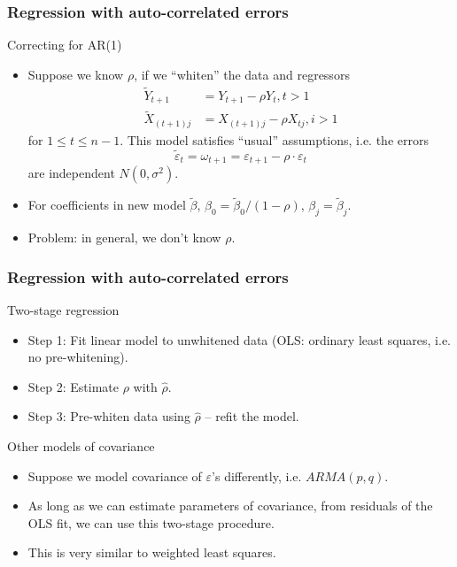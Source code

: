 \documentclass[handout]{beamer}
\begin{document}
   \begin{frame} \frametitle{Regression with auto-correlated errors}

   \begin{block}
   {Correcting for AR(1)                      }
   \begin{itemize}
   \item Suppose we know $\rho$, if we ``whiten'' the data and regressors
   $$
   \begin{aligned}
   \tilde{Y}_{t+1} &= Y_{t+1} - \rho Y_t, t > 1   \\
   \tilde{X}_{(t+1)j} &= X_{(t+1)j} - \rho X_{tj}, i > 1
   \end{aligned}
   $$
   for $1 \leq t \leq n-1$.
   This model satisfies ``usual'' assumptions, i.e. the errors
   $$
   \tilde{\varepsilon}_t = \omega_{t+1} = \varepsilon_{t+1} - \rho \cdot \varepsilon_t$$
   are independent $N(0,\sigma^2)$.

   \item For coefficients in new model $\tilde{\beta}$, $\beta_0 = \tilde{\beta}_0 / (1 - \rho)$, $\beta_j = \tilde{\beta}_j.$

   \item Problem: in general, we don't know $\rho$.
   \end{itemize}
   \end{block}
   \end{frame}


   \begin{frame} \frametitle{Regression with auto-correlated errors}

   \begin{block}
   {Two-stage regression}
   \begin{itemize}
   \item Step 1: Fit linear model to unwhitened data (OLS: ordinary least squares, i.e. no pre-whitening).

   \item Step 2: Estimate $\rho$ with $\widehat{\rho}$.


   \item Step 3: Pre-whiten data using $\widehat{\rho}$ -- refit the model.
   \end{itemize}
   \end{block}
   \begin{block}
   {Other models of covariance}
   \begin{itemize}
   \item Suppose we model covariance of $\varepsilon$'s differently, i.e.
   $ARMA(p,q)$.

   \item As long as we can estimate parameters of covariance, from residuals
   of the OLS fit, we can use this two-stage procedure.

   \item This is very similar to weighted least squares.
   \end{itemize}
   \end{block}
   \end{frame}
\end{document}

